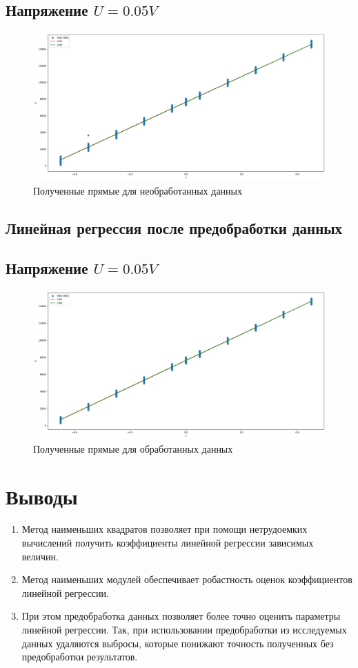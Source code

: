 \documentclass[12pt]{article}
\begin{document}
\subsection{Напряжение $U = 0.05V$}
\begin{figure}[htbp!]
    \begin{center}
        \includegraphics[width = 0.7\linewidth]{plots/unfiltered.png}
        \caption{Полученные прямые для необработанных данных}
    \end{center}
\end{figure}

\subsection{Линейная регрессия после предобработки данных}
\subsection{Напряжение $U = 0.05V$}
\begin{figure}[htbp!]
    \begin{center}
        \includegraphics[width = 0.7\linewidth]{plots/filtered.png}
        \caption{Полученные прямые для обработанных данных}
    \end{center}
\end{figure}

\section{Выводы}
\begin{enumerate}
    \item Метод наименьших квадратов позволяет при помощи нетрудоемких вычислений получить коэффициенты линейной регрессии зависимых величин.
    \item Метод наименьших модулей обеспечивает робастность оценок коэффициентов линейной регрессии.
    \item При этом предобработка данных позволяет более точно оценить параметры линейной регрессии. Так, при использовании предобработки из исследуемых данных удаляются выбросы, которые понижают точность полученных без предобработки результатов.
\end{enumerate}
\newpage
\end{document}
